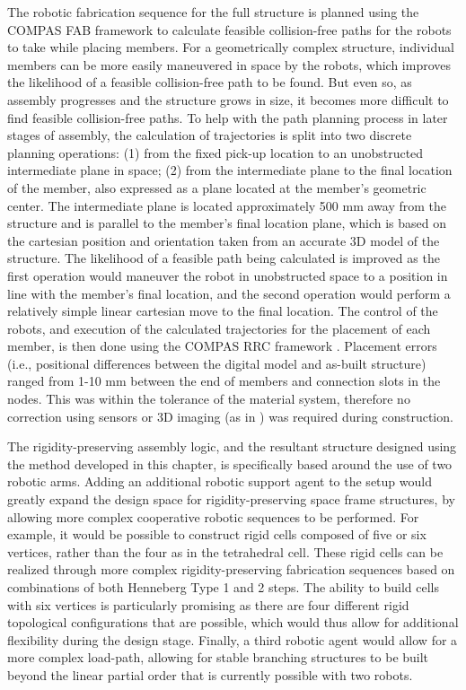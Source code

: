     \newpage
    The robotic fabrication sequence for the full structure is planned using the COMPAS FAB framework \citep{mele_compas_2017} to calculate feasible collision-free paths for the robots to take while placing members. For a geometrically complex structure, individual members can be more easily maneuvered in space by the robots, which improves the likelihood of a feasible collision-free path to be found. But even so, as assembly progresses and the structure grows in size, it becomes more difficult to find feasible collision-free paths. To help with the path planning process in later stages of assembly, the calculation of trajectories is split into two discrete planning operations: (1) from the fixed pick-up location to an unobstructed intermediate plane in space; (2) from the intermediate plane to the final location of the member, also expressed as a plane located at the member's geometric center. The intermediate plane is located approximately 500 mm away from the structure and is parallel to the member's final location plane, which is based on the cartesian position and orientation taken from an accurate 3D model of the structure. The likelihood of a feasible path being calculated is improved as the first operation would maneuver the robot in unobstructed space to a position in line with the member's final location, and the second operation would perform a relatively simple linear cartesian move to the final location. The control of the robots, and execution of the calculated trajectories for the placement of each member, is then done using the COMPAS RRC framework \citep{fleischmann_compas_2020}. Placement errors (i.e., positional differences between the digital model and as-built structure) ranged from 1-10 mm between the end of members and connection slots in the nodes. This was within the tolerance of the material system, therefore no correction using sensors or 3D imaging (as in \citep{ding_bim-based_2020}) was required during construction.

    The rigidity-preserving assembly logic, and the resultant structure designed using the method developed in this chapter, is specifically based around the use of two robotic arms. Adding an additional robotic support agent to the setup would greatly expand the design space for rigidity-preserving space frame structures, by allowing more complex cooperative robotic sequences to be performed. For example, it would be possible to construct rigid cells composed of five or six vertices, rather than the four as in the tetrahedral cell. These rigid cells can be realized through more complex rigidity-preserving fabrication sequences based on combinations of both Henneberg Type 1 and 2 steps. The ability to build cells with six vertices is particularly promising as there are four different rigid topological configurations that are possible, which would thus allow for additional flexibility during the design stage. Finally, a third robotic agent would allow for a more complex load-path, allowing for stable branching structures to be built beyond the linear partial order that is currently possible with two robots. 



